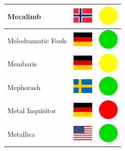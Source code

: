 \documentclass[12pt, a4paper, twoside]{report}
\begin{document}
\begin{center}
\begin{longtable}{|p{5cm}|p{2cm}|p{2cm}|}
 Mecalimb                                                   & \includegraphics[width=1cm]{4x3/no} &   \includegraphics[width=1cm]{likes/m} \\ \hline
 Melodramatic Fools                                         & \includegraphics[width=1cm]{4x3/de} &   \includegraphics[width=1cm]{likes/y} \\ \hline
 Membaris                                                   & \includegraphics[width=1cm]{4x3/de} &   \includegraphics[width=1cm]{likes/m} \\ \hline
 Mephorash                                                  & \includegraphics[width=1cm]{4x3/se} &   \includegraphics[width=1cm]{likes/y} \\ \hline
 Metal Inquisitor                                           & \includegraphics[width=1cm]{4x3/de} &   \includegraphics[width=1cm]{likes/n} \\ \hline
 Metallica                                                  & \includegraphics[width=1cm]{4x3/us} &   \includegraphics[width=1cm]{likes/y} \\ \hline

\end{longtable}
\end{center}
\end{document}
